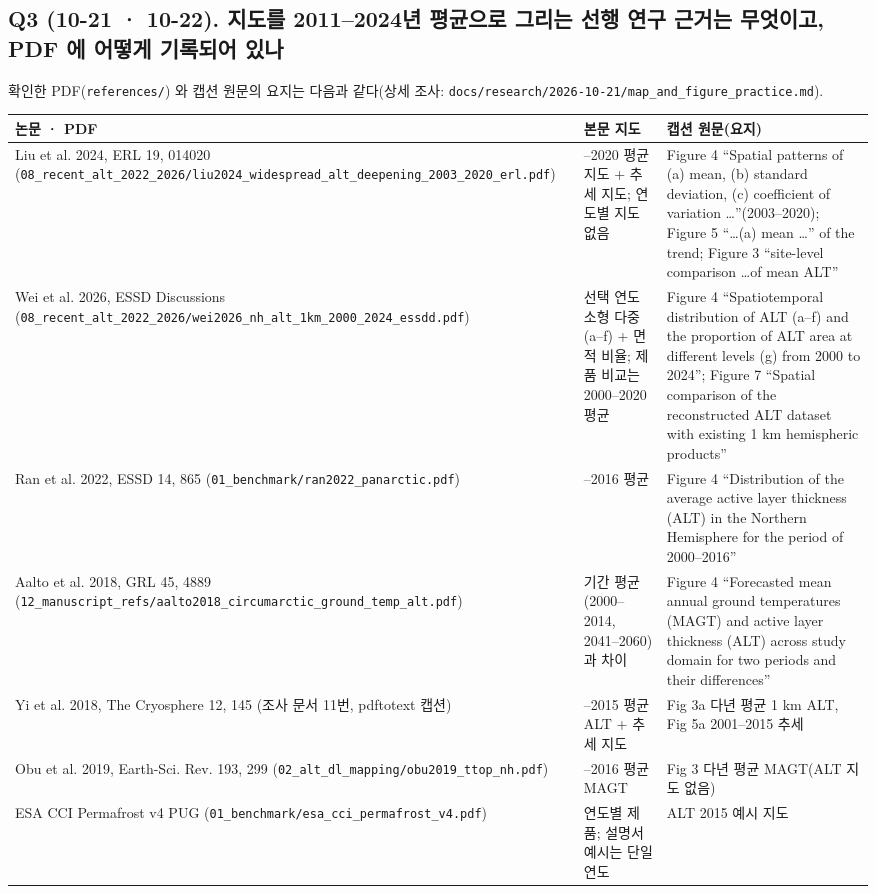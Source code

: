 \documentclass[10pt,a4paper]{article}
\begin{document}
\subsection*{Q3 (10-21 · 10-22). 지도를 2011--2024년 평균으로 그리는 선행 연구 근거는 무엇이고, PDF 에 어떻게 기록되어 있나}
확인한 PDF(\texttt{references/}) 와 캡션 원문의 요지는 다음과 같다(상세 조사: \texttt{docs/research/2026-10-21/map\_and\_figure\_practice.md}).
\begin{small}\begin{tabularx}{\textwidth}{@{}>{\raggedright\arraybackslash}p{}>{\raggedright\arraybackslash}p{}X@{}}
\toprule 논문 · PDF & 본문 지도 & 캡션 원문(요지) \\ \midrule
Liu et al. 2024, ERL 19, 014020 (\texttt{08\_recent\_alt\_2022\_2026/liu2024\_widespread\_alt\_deepening\_2003\_2020\_erl.pdf}) & 2003--2020 평균 지도 + 추세 지도; 연도별 지도 없음 & Figure 4 ``Spatial patterns of (a) mean, (b) standard deviation, (c) coefficient of variation \ldots''(2003--2020); Figure 5 ``\ldots (a) mean \ldots'' of the trend; Figure 3 ``site-level comparison \ldots of mean ALT'' \\
Wei et al. 2026, ESSD Discussions (\texttt{08\_recent\_alt\_2022\_2026/wei2026\_nh\_alt\_1km\_2000\_2024\_essdd.pdf}) & 선택 연도 소형 다중(a--f) + 면적 비율; 제품 비교는 2000--2020 평균 & Figure 4 ``Spatiotemporal distribution of ALT (a--f) and the proportion of ALT area at different levels (g) from 2000 to 2024''; Figure 7 ``Spatial comparison of the reconstructed ALT dataset with existing 1 km hemispheric products'' \\
Ran et al. 2022, ESSD 14, 865 (\texttt{01\_benchmark/ran2022\_panarctic.pdf}) & 2000--2016 평균 & Figure 4 ``Distribution of the average active layer thickness (ALT) in the Northern Hemisphere for the period of 2000--2016'' \\
Aalto et al. 2018, GRL 45, 4889 (\texttt{12\_manuscript\_refs/aalto2018\_circumarctic\_ground\_temp\_alt.pdf}) & 기간 평균(2000--2014, 2041--2060)과 차이 & Figure 4 ``Forecasted mean annual ground temperatures (MAGT) and active layer thickness (ALT) across study domain for two periods and their differences'' \\
Yi et al. 2018, The Cryosphere 12, 145 (조사 문서 11번, pdftotext 캡션) & 2001--2015 평균 ALT + 추세 지도 & Fig 3a 다년 평균 1 km ALT, Fig 5a 2001--2015 추세 \\
Obu et al. 2019, Earth-Sci. Rev. 193, 299 (\texttt{02\_alt\_dl\_mapping/obu2019\_ttop\_nh.pdf}) & 2000--2016 평균 MAGT & Fig 3 다년 평균 MAGT(ALT 지도 없음) \\
ESA CCI Permafrost v4 PUG (\texttt{01\_benchmark/esa\_cci\_permafrost\_v4.pdf}) & 연도별 제품; 설명서 예시는 단일 연도 & ALT 2015 예시 지도 \\
\bottomrule\end{tabularx}\end{small}
\end{document}
